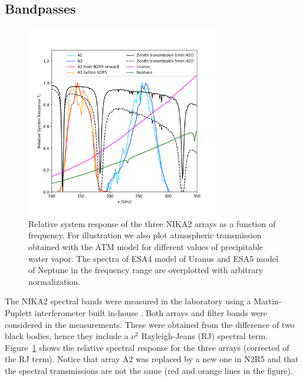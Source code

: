 


\subsection{Bandpasses}%
\label{se:bandpasses}

\begin{figure}[ht!] %
\begin{center}
\includegraphics[clip,trim={0, 1cm, 0, 2cm},width=0.75\textwidth]{Figures/SpectralBands/bandpasses_nika2_colorsok.png}
\caption[NIKA2 transmission]{Relative system response of the three NIKA2 arrays as a
  function of frequency. For illustration we also plot atmospheric transmission obtained with the ATM model 
 \cite{ATM} for different values of precipitable water vapor. The spectra of ESA4 model of Uranus and ESA5 model of Neptune \cite{ESAmodel} in the frequency range are overplotted with arbitrary normalization.} 
 \label{spectralband1}
\end{center}
\end{figure}

 

The NIKA2 spectral bands were measured in the laboratory using a
Martin-Puplett interferometer built in-house \cite{durand}.  Both
arrays and filter bands were considered in the measurements. These
were obtained from the difference of two black bodies, hence they
include a $\nu^2$ Rayleigh-Jeans (RJ) spectral term.
Figure~\ref{spectralband1} shows the relative spectral response for
the three arrays (corrected of the RJ term).  Notice that array A2 was
replaced by a new one in N2R5 and that the spectral transmissions are
not the same (red and orange lines in the figure).

